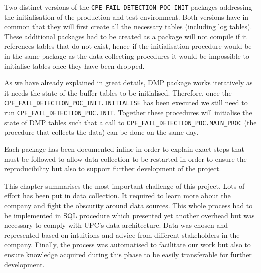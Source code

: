 Two distinct versions of the \texttt{CPE\_FAIL\_DETECTION\_POC\_INIT} packages addressing the initialisation of the production and test environment. Both versions have in common that they will first create all the necessary tables (including log tables). These additional packages had to be created as a package will not compile if it references tables that do not exist, hence if the initialisation procedure would be in the same package as the data collecting procedures it would be impossible to initialise tables once they have been dropped.

As we have already explained in great details, DMP package works iteratively as it needs the state of the buffer tables to be initialised. Therefore, once the \texttt{CPE\_FAIL\_DETECTION\_POC\_INIT.INITIALISE} has been executed we still need to run \texttt{CPE\_FAIL\_DETECTION\_POC.INIT}. Together these procedures will initialise the state of DMP tables such that a call to \texttt{CPE\_FAIL\_DETECTION\_POC.MAIN\_PROC} (the procedure that collects the data) can be done on the same day. 

Each package has been documented inline in order to explain exact steps that must be followed to allow data collection to be restarted in order to ensure the reproducibility but also to support further development of the project.

\vspace{1 \baselineskip} 
This chapter summarises the most important challenge of this project. Lots of effort has been put in data collection. It required to learn more about the company and fight the obscurity around data sources. This whole process had to be implemented in SQL procedure which presented yet another overhead but was necessary to comply with UPC's data architecture. Data was chosen and represented based on intuitions and advice from different stakeholders in the company. Finally, the process was automatised to facilitate our work but also to ensure knowledge acquired during this phase to be easily transferable for further development. 